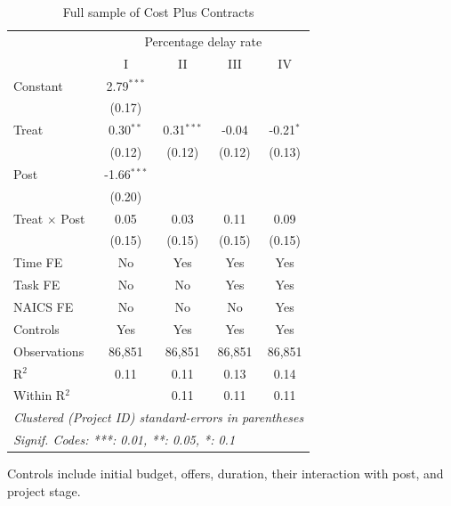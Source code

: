\documentclass[
]{article}
\begin{document}
\begin{table}[htbp]
   \caption{Full sample of Cost Plus Contracts}
   \centering
   \footnotesize
   \begin{tabular}{lcccc}
      \toprule
       & \multicolumn{4}{c}{Percentage delay rate}\\
                           & I             & II           & III    & IV\\  
      \midrule 
      Constant             & 2.79$^{***}$  &              &        &   \\   
                           & (0.17)        &              &        &   \\   
      Treat                & 0.30$^{**}$   & 0.31$^{***}$ & -0.04  & -0.21$^{*}$\\   
                           & (0.12)        & (0.12)       & (0.12) & (0.13)\\   
      Post                 & -1.66$^{***}$ &              &        &   \\   
                           & (0.20)        &              &        &   \\   
      Treat $\times$ Post  & 0.05          & 0.03         & 0.11   & 0.09\\   
                           & (0.15)        & (0.15)       & (0.15) & (0.15)\\   
      \midrule 
      Time FE              & No            & Yes          & Yes    & Yes\\  
      Task FE              & No            & No           & Yes    & Yes\\  
      NAICS FE             & No            & No           & No     & Yes\\  
      Controls             & Yes           & Yes          & Yes    & Yes\\  
      Observations         & 86,851        & 86,851       & 86,851 & 86,851\\  
      R$^2$                & 0.11          & 0.11         & 0.13   & 0.14\\  
      Within R$^2$         &               & 0.11         & 0.11   & 0.11\\  
      \midrule
      \multicolumn{5}{l}{\emph{Clustered (Project ID) standard-errors in parentheses}}\\
      \multicolumn{5}{l}{\emph{Signif. Codes: ***: 0.01, **: 0.05, *: 0.1}}\\
   \end{tabular}
   
   \par \raggedright 
   Controls include initial budget, offers, duration, their interaction with post, and project stage. 
\end{table}
\end{document}
